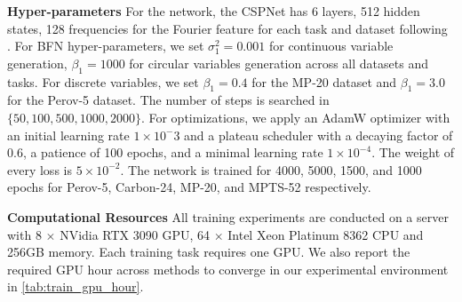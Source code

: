 \textbf{Hyper-parameters} For the network, the CSPNet has 6 layers, 512 hidden states, 128 frequencies for the Fourier feature for each task and dataset following \citep{jiao2023crystal}. For BFN hyper-parameters, we set $\sigma_1^2=0.001$ for continuous variable generation, $\beta_1=1000$ for circular variables generation across all datasets and tasks. For discrete variables, we set $\beta_1=0.4$ for the MP-20 dataset and $\beta_1=3.0$ for the Perov-5 dataset. The number of steps is searched in $\{50,100,500,1000,2000\}$. For optimizations, we apply an AdamW optimizer with an initial learning rate $1\times10^-3$ and a plateau scheduler with a decaying factor of 0.6, a patience of 100 epochs, and a minimal learning rate $1\times10^{-4}$. The weight of every loss is $5\times10^{-2}$. The network is trained for 4000, 5000, 1500, and 1000 epochs for Perov-5, Carbon-24, MP-20, and MPTS-52 respectively.

\textbf{Computational Resources} All training experiments are conducted on a server with 8 $\times$ NVidia RTX 3090 GPU, 64 $\times$ Intel Xeon Platinum 8362 CPU and 256GB memory. Each training task requires one GPU. We also report the required GPU hour across methods to converge in our experimental environment in \cref{tab:train_gpu_hour}.

\begin{table*}[h!]
  \centering
  \caption{Comparison of GPU hours required for training across different methods.}
\vskip -0.15in
 \label{tab:train_gpu_hour}%
\end{table*}%


